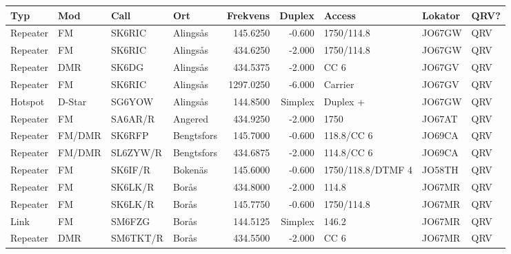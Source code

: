 {\begin{landscape}
\begin{longtable}{llllrrlll}
	\bf Typ           & \bf Mod         & \bf Call & \bf Ort               & \bf Frekvens & \bf Duplex & \bf Access        & \bf Lokator & \bf QRV? \\ \hline
	\endhead
Repeater & FM              & SK6RIC   & Alingsås              &     145.6250 &     -0.600 & 1750/114.8        & JO67GW      & QRV      \\
	Repeater          & FM              & SK6RIC   & Alingsås              &     434.6250 &     -2.000 & 1750/114.8        & JO67GW      & QRV      \\
	Repeater          & DMR             & SK6DG    & Alingsås              &     434.5375 &     -2.000 & CC 6              & JO67GV      & QRV      \\
	Repeater          & FM              & SK6RIC   & Alingsås              &    1297.0250 &     -6.000 & Carrier           & JO67GV      & QRV      \\
	Hotspot           & D-Star          & SG6YOW   & Alingsås              &     144.8500 &    Simplex & Duplex +          & JO67GW      & QRV      \\
	Repeater          & FM              & SA6AR/R  & Angered               &     434.9250 &     -2.000 & 1750              & JO67AT      & QRV      \\
	Repeater          & FM/DMR          & SK6RFP   & Bengtsfors            &     145.7000 &     -0.600 & 118.8/CC 6        & JO69CA      & QRV      \\
	Repeater          & FM/DMR          & SL6ZYW/R & Bengtsfors            &     434.6875 &     -2.000 & 114.8/CC 6        & JO69CA      & QRV      \\
	Repeater          & FM              & SK6IF/R  & Bokenäs               &     145.6000 &     -0.600 & 1750/118.8/DTMF 4 & JO58TH      & QRV      \\
	Repeater          & FM              & SK6LK/R  & Borås                 &     434.8000 &     -2.000 & 114.8             & JO67MR      & QRV      \\
	Repeater          & FM              & SK6LK/R  & Borås                 &     145.7750 &     -0.600 & 1750/114.8        & JO67MR      & QRV      \\
	Link              & FM              & SM6FZG   & Borås                 &     144.5125 &    Simplex & 146.2             & JO67MR      & QRV      \\
	Repeater          & DMR             & SM6TKT/R & Borås                 &     434.5500 &     -2.000 & CC 6              & JO67MR      & QRV      \\

\end{longtable}
\end{landscape}}
